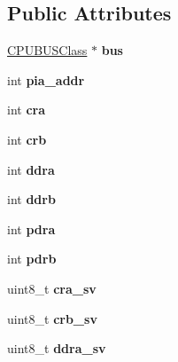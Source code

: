 \subsection*{Public Attributes}
\begin{DoxyCompactItemize}
\item 
\hypertarget{classMC6821_afc584e97eabf81051680b9a174bbce27}{\hyperlink{classCPUBUSClass}{C\-P\-U\-B\-U\-S\-Class} $\ast$ {\bfseries bus}}\label{classMC6821_afc584e97eabf81051680b9a174bbce27}

\item 
\hypertarget{classMC6821_afd059b6e851834c09f687e704f13c291}{int {\bfseries pia\-\_\-addr}}\label{classMC6821_afd059b6e851834c09f687e704f13c291}

\item 
\hypertarget{classMC6821_a620a47d50bb48aa7d3e1b7fc06606eb8}{int {\bfseries cra}}\label{classMC6821_a620a47d50bb48aa7d3e1b7fc06606eb8}

\item 
\hypertarget{classMC6821_a3b3c1610c32fc9c30cea82305bda9877}{int {\bfseries crb}}\label{classMC6821_a3b3c1610c32fc9c30cea82305bda9877}

\item 
\hypertarget{classMC6821_a9e4c3b0a432332a3171b7a64db5c9e2c}{int {\bfseries ddra}}\label{classMC6821_a9e4c3b0a432332a3171b7a64db5c9e2c}

\item 
\hypertarget{classMC6821_a3e4d74ba5f7a53d4df771a31153697f8}{int {\bfseries ddrb}}\label{classMC6821_a3e4d74ba5f7a53d4df771a31153697f8}

\item 
\hypertarget{classMC6821_abee44252a30363d98b5abcdd5745f9c0}{int {\bfseries pdra}}\label{classMC6821_abee44252a30363d98b5abcdd5745f9c0}

\item 
\hypertarget{classMC6821_ab8b937f3d2a6d17ae491261943376bd1}{int {\bfseries pdrb}}\label{classMC6821_ab8b937f3d2a6d17ae491261943376bd1}

\item 
\hypertarget{classMC6821_ad0dd3c7d0134188d0289b5df6223efce}{uint8\-\_\-t {\bfseries cra\-\_\-sv}}\label{classMC6821_ad0dd3c7d0134188d0289b5df6223efce}

\item 
\hypertarget{classMC6821_a93a9efc2dc448b508e944f4534565b53}{uint8\-\_\-t {\bfseries crb\-\_\-sv}}\label{classMC6821_a93a9efc2dc448b508e944f4534565b53}

\item 
\hypertarget{classMC6821_a1cf9d17cbc77627cc6610f72c0eb404b}{uint8\-\_\-t {\bfseries ddra\-\_\-sv}}\label{classMC6821_a1cf9d17cbc77627cc6610f72c0eb404b}


\end{DoxyCompactItemize}
